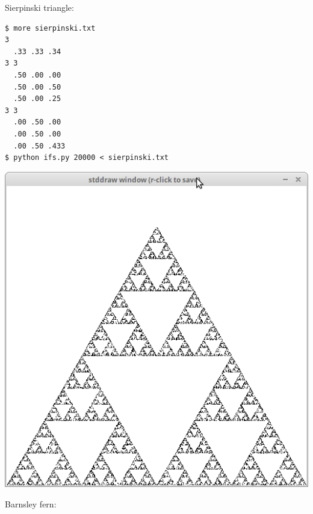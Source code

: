 \documentclass[8pt,a4paper,compress,handout]{beamer}
\begin{document}
\begin{frame}[fragile]
Sierpinski triangle:

\begin{minipage}{160pt}
\begin{lstlisting}[language={}]
$ more sierpinski.txt
3   
  .33 .33 .34 
3 3 
  .50 .00 .00 
  .50 .00 .50 
  .50 .00 .25 
3 3 
  .00 .50 .00 
  .00 .50 .00 
  .00 .50 .433 
$ python ifs.py 20000 < sierpinski.txt
\end{lstlisting}
\end{minipage}%
\begin{minipage}{140pt}
\begin{center}
\hfill \includegraphics[scale=0.17]{figures/sierpinski.png}
\end{center}
\end{minipage}

\bigskip

Barnsley fern:


\end{frame}
\end{document}
